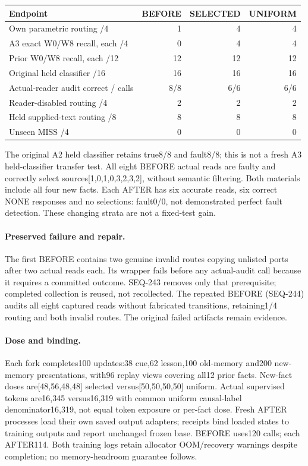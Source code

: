 \documentclass[11pt]{article}
\begin{document}
\begin{center}
\small
\begin{tabular}{lrrr}
\toprule
Endpoint & BEFORE & SELECTED & UNIFORM \\
\midrule
Own parametric routing /4 & 1 & 4 & 4 \\
A3 exact W0/W8 recall, each /4 & 0 & 4 & 4 \\
Prior W0/W8 recall, each /12 & 12 & 12 & 12 \\
Original held classifier /16 & 16 & 16 & 16 \\
Actual-reader audit correct / calls & 8/8 & 6/6 & 6/6 \\
Reader-disabled routing /4 & 2 & 2 & 2 \\
Held supplied-text routing /8 & 8 & 8 & 8 \\
Unseen MISS /4 & 0 & 0 & 0 \\
\bottomrule
\end{tabular}
\end{center}

The original A2 held classifier retains true8/8 and fault8/8; this is not a
fresh A3 held-classifier transfer test. All eight BEFORE actual reads are
faulty and correctly select sources[1,0,1,0,3,2,3,2], without semantic filtering.
Both materials include all four new facts. Each AFTER has six accurate reads,
six correct NONE responses and no selections: fault0/0, not demonstrated
perfect fault detection. These changing strata are not a fixed-test gain.

\paragraph{Preserved failure and repair.}
The first BEFORE contains two genuine invalid routes copying unlisted ports
after two actual reads each. Its wrapper fails before any actual-audit call
because it requires a committed outcome. SEQ-243 removes only that prerequisite;
completed collection is reused, not recollected. The repeated BEFORE (SEQ-244)
audits all eight captured reads without fabricated transitions, retaining1/4
routing and both invalid routes. The original failed artifacts remain evidence.

\paragraph{Dose and binding.}
Each fork completes100 updates:38 cue,62 lesson,100 old-memory and200 new-memory
presentations, with96 replay views covering all12 prior facts. New-fact doses
are[48,56,48,48] selected versus[50,50,50,50] uniform. Actual supervised tokens
are16,345 versus16,319 with common uniform causal-label denominator16,319,
not equal token exposure or per-fact dose. Fresh AFTER processes load their
own saved output adapters; receipts bind loaded states to training outputs and
report unchanged frozen base. BEFORE uses120 calls; each AFTER114.
Both training logs retain allocator OOM/recovery warnings despite completion;
no memory-headroom guarantee follows.
\end{document}
